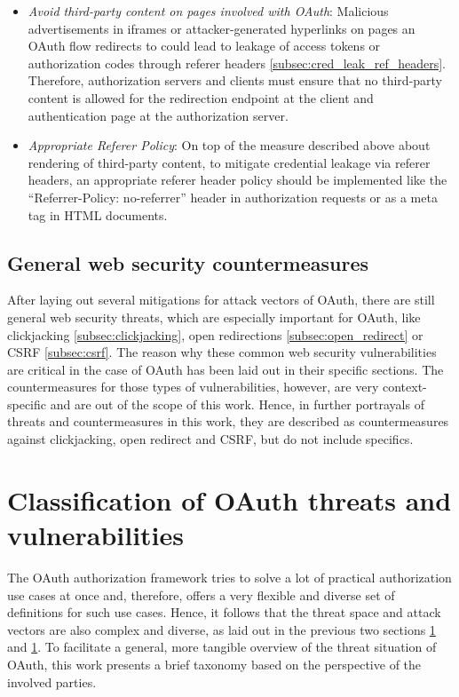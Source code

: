 \documentclass[
    fontsize=12pt,
    headings=small,
    parskip=half,           %
    bibliography=totoc,
    numbers=noenddot,       %
    open=any,               %
    ]{scrreprt}
\begin{document}
\begin{itemize}
\item \emph{Avoid third-party content on pages involved with OAuth}:
\label{item:avoid3rd}
Malicious advertisements in iframes or attacker-generated hyperlinks on pages an OAuth flow redirects to could lead to leakage of access tokens or authorization codes through referer headers \ref{subsec:cred_leak_ref_headers}. Therefore, authorization servers and clients must ensure that no third-party content is allowed for the redirection endpoint at the client and authentication page at the authorization server.

\item \emph{Appropriate Referer Policy}: On top of the measure described above about rendering of third-party content, to mitigate credential leakage via referer headers, an appropriate referer header policy should be implemented like the ``Referrer-Policy: no-referrer'' header in authorization requests or as a meta tag in HTML documents.

\end{itemize}

\subsection{General web security countermeasures}
After laying out several mitigations for attack vectors of OAuth, there are still general web security threats, which are especially important for OAuth, like clickjacking \ref{subsec:clickjacking}, open redirections \ref{subsec:open_redirect} or CSRF \ref{subsec:csrf}. The reason why these common web security vulnerabilities are critical in the case of OAuth has been laid out in their specific sections. The countermeasures for those types of vulnerabilities, however, are very context-specific and are out of the scope of this work. Hence, in further portrayals of threats and countermeasures in this work, they are described as countermeasures against clickjacking, open redirect and CSRF, but do not include specifics.

\section{Classification of OAuth threats and vulnerabilities}
The OAuth authorization framework tries to solve a lot of practical authorization use cases at once and, therefore, offers a very flexible and diverse set of definitions for such use cases. Hence, it follows that the threat space and attack vectors are also complex and diverse, as laid out in the previous two sections \ref{} and \ref{}. To facilitate a general, more tangible overview of the threat situation of OAuth, this work presents a brief taxonomy based on the perspective of the involved parties.
\end{document}
